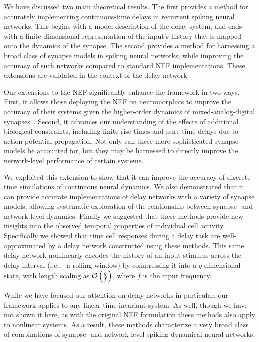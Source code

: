 We have discussed two main theoretical results.
The first provides a method for accurately implementing continuous-time delays in recurrent spiking neural networks.
This begins with a model description of the delay system, and ends with a finite-dimensional representation of the input's history that is mapped onto the dynamics of the synapse.
The second provides a method for harnessing a broad class of synapse models in spiking neural networks, while improving the accuracy of such networks compared to standard NEF implementations.
These extensions are validated in the context of the delay network.

Our extensions to the NEF significantly enhance the framework in two ways.
First, it allows those deploying the NEF on neuromorphics to improve the accuracy of their systems given the higher-order dynamics of mixed-analog-digital synapses~\citep{voelker2017iscas, voelker2017neuromorphic}.
Second, it advances our understanding of the effects of additional biological constraints, including finite rise-times and pure time-delays due to action potential propagation.
Not only can these more sophisticated synapse models be accounted for, but they may be harnessed to directly improve the network-level performance of certain systems.

We exploited this extension to show that it can improve the accuracy of discrete-time simulations of continuous neural dynamics.
We also demonstrated that it can provide accurate implementations of delay networks with a variety of synapse models, allowing systematic exploration of the relationship between synapse- and network-level dynamics.
Finally we suggested that these methods provide new insights into the observed temporal properties of individual cell activity.
Specifically we showed that time cell responses during a delay task are well-approximated by a delay network constructed using these methods.
This same delay network nonlinearly encodes the history of an input stimulus across the delay interval (i.e.,~ a rolling window) by compressing it into a $q$-dimensional state, with length scaling as $\mathcal{O}\left({ \frac{q}{f} }\right)$, where $f$ is the input frequency.

While we have focused our attention on delay networks in particular, our framework applies to any linear time-invariant system.
As well, though we have not shown it here, as with the original NEF formulation these methods also apply to nonlinear systems.
As a result, these methods characterize a very broad class of combinations of synapse- and network-level spiking dynamical neural networks.

